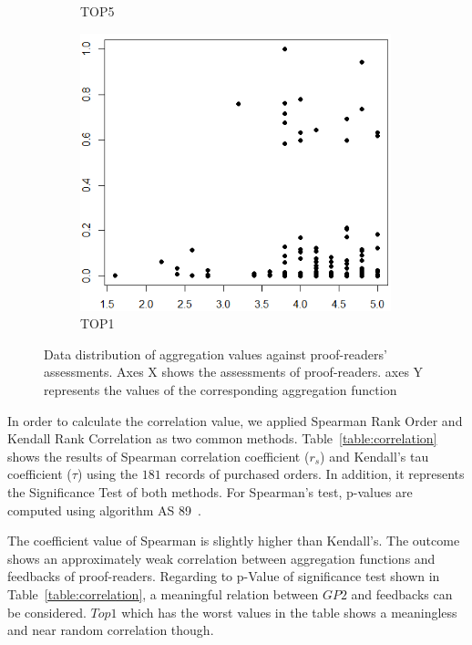 \begin{figure}
\begin{subfigure}{.3\textwidth}
	\caption{TOP5}
\end{subfigure}%
\begin{subfigure}{.3\textwidth}
  \centering
	\includegraphics[width=0.99\textwidth]{figures/aggregation_plots_top1.png}
	\caption{TOP1}
\end{subfigure}
\vspace{-0.3cm}
\caption{Data distribution of aggregation values against proof-readers' assessments. Axes X shows the assessments of proof-readers. axes Y represents the values of the corresponding aggregation function}
\label{fig:aggregationplot}
\vspace{-0.3cm}
\end{figure}

In order to calculate the correlation value, we applied Spearman Rank Order and Kendall Rank Correlation as two common methods. Table~\ref{table:correlation} shows the results of Spearman correlation coefficient ($r_s$) and Kendall's tau coefficient ($\tau$) using the $181$ records of purchased orders. In addition, it represents the Significance Test of both methods. For Spearman's test, p-values are computed using algorithm AS 89~\cite{as89}.

The coefficient value of Spearman is slightly higher than Kendall's. The outcome shows an approximately weak correlation between aggregation functions and feedbacks of proof-readers. Regarding to p-Value of significance test shown in Table~\ref{table:correlation}, a meaningful relation between $GP2$ and feedbacks can be considered. $Top1$ which has the worst values in the table shows a meaningless and near random correlation though.

